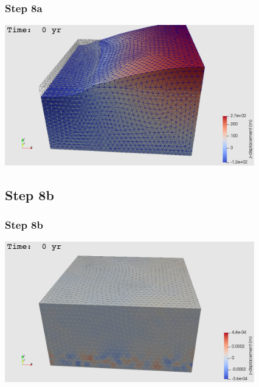 \documentclass{beamer}
\begin{document}
\begin{frame}
  \frametitle{Step 8a}

  \vfill
  \begin{center}
      \includegraphics[height=6.1cm]{figs/subduction3d_step08a_soln}
  \end{center}
\vfill
      
\end{frame}


\subsection{Step 8b}

\begin{frame}
  \frametitle{Step 8b}

  \vfill
  \begin{center}
      \includegraphics[height=6.1cm]{figs/subduction3d_step08b_soln}
  \end{center}
\vfill
      
\end{frame}
\end{document}
